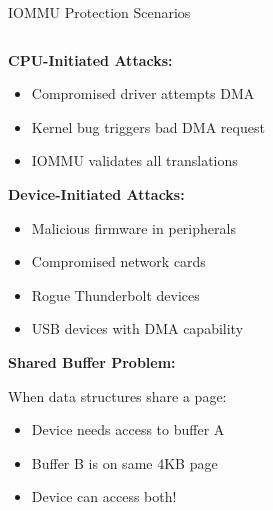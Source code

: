 \documentclass[aspectratio=169,12pt]{beamer}
\begin{document}
\begin{frame}{IOMMU Protection Scenarios}
    \begin{columns}
        \begin{column}{0.5\textwidth}
            \textbf{CPU-Initiated Attacks:}
            \begin{itemize}
                \item Compromised driver attempts DMA
                \item Kernel bug triggers bad DMA request
                \item IOMMU validates all translations
            \end{itemize}
            
            \vspace{0.3cm}
            \textbf{Device-Initiated Attacks:}
            \begin{itemize}
                \item Malicious firmware in peripherals
                \item Compromised network cards
                \item Rogue Thunderbolt devices
                \item USB devices with DMA capability
            \end{itemize}
            
            \vspace{0.3cm}
            \textbf{Shared Buffer Problem:}
            \begin{tcolorbox}[colback=yellow!20]
                \small
                When data structures share a page:
                \begin{itemize}
                    \item Device needs access to buffer A
                    \item Buffer B is on same 4KB page
                    \item Device can access both!
                \end{itemize}
            \end{tcolorbox}
        \end{column}
        \begin{column}{0.5\textwidth}
\end{column}
\end{columns}
\end{frame}
\end{document}

